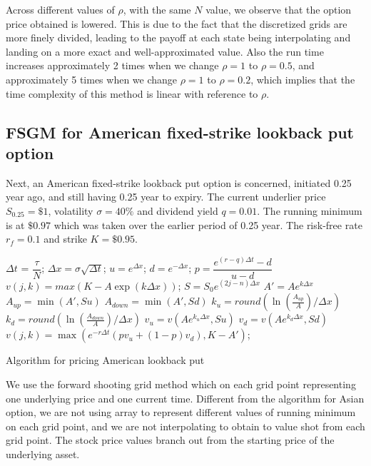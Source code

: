 Across different values of $\rho$, with the same $N$ value, we observe that the option price obtained is lowered. This is due to the fact that the discretized grids are more finely divided, leading to the payoff at each state being interpolating and landing on a more exact and well-approximated value. Also the run time increases approximately 2 times when we change $\rho=1$ to $\rho=0.5$, and approximately 5 times when we change $\rho=1$ to $\rho=0.2$, which implies that the time complexity of this method is linear with reference to $\rho$.

\subsection{FSGM for American fixed-strike lookback put option}
Next, an American fixed-strike lookback put option is concerned, initiated 0.25 year ago, and still having 0.25 year to expiry. The current underlier price $S_{0.25}=\$1$, volatility $\sigma=40\%$ and dividend yield $q = 0.01$. The running minimum is at $\$0.97$ which was taken over the earlier period of 0.25 year. The risk-free rate $r_f=0.1$ and strike $K=\$0.95$.

\begin{algorithm}[H]
	$\Delta t$ = $\dfrac{\tau}{N}$;
	$\Delta x = \sigma \sqrt{\Delta t}$;
	$u = e^{\Delta x}$;
	$d = e^{-\Delta x}$;
	$p = \dfrac{e^{(r-q) \Delta t} - d}{u - d}$\;
	 {
		 {
			$v(j, k) = max(K - A \exp(k \Delta x))$;
		}
	}
	 {
		 {
			 {
				$S = S_{0} e^{(2j - n) \Delta x}$\;
				$A' = A e^{k \Delta x}$\;
				$A_{up} = \min(A', Su)$\;
				$A_{down} = \min(A', Sd)$\;
				$k_{u} = round(\ln(\frac{A_{up}}{A}) / \Delta x)$\;
				$k_{d} = round(\ln(\frac{A_{down}}{A}) / \Delta x)$\;
				$v_{u} = v(A e^{k_{u}\Delta x}, Su)$\;
				$v_{d} = v(A e^{k_{d}\Delta x}, Sd)$\;
				$v(j,k) = \max(e^{-r \Delta t}(pv_{u} + (1-p)v_{d}), K - A')$;
			}
		}
	}
\caption{Algorithm for pricing American lookback put}
\end{algorithm}

We use the forward shooting grid method which on each grid point representing one underlying price and one current time. Different from the algorithm for Asian option, we are not using array to represent different values of running minimum on each grid point, and we are not interpolating to obtain to value shot from each grid point. The stock price values branch out from the starting price of the underlying asset.

